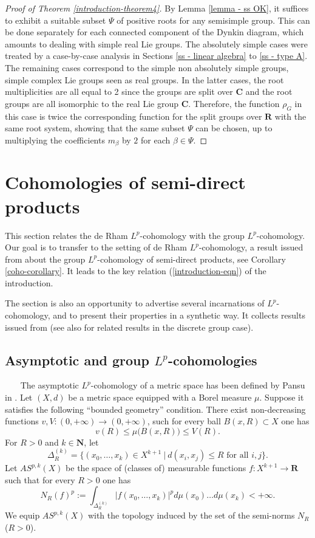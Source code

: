 \documentclass[JEP,XML,SOM,Unicode,published]{cedram}
\newcommand{\CC}{\mathbf{C}}
\newcommand{\NN}{\mathbf{N}}
\newcommand{\RR}{\mathbf{R}}
\theoremstyle{plain}
\theoremstyle{remark}
\theoremstyle{definition}
\begin{document}
\begin{proof}[Proof of Theorem \ref{introduction-theorem4}]
By Lemma \ref{lemma - ss OK}, it suffices to exhibit a suitable subset $\Psi$ of positive roots for any semisimple group.
This can be done separately for each connected component of the Dynkin diagram, which amounts to dealing with simple real Lie groups.
The absolutely simple cases were treated by a case-by-case analysis in Sections \ref{ss - linear algebra} to \ref{ss - type A}.
The remaining cases correspond to the simple non absolutely simple groups, \ie simple complex Lie groups seen as real groups.
In the latter cases, the root multiplicities are all equal to 2 since the groups are split over $\CC$ and the root groups are all isomorphic to the real Lie group $\CC$.
Therefore, the function $\rho_G$ in this case is twice the corresponding function for the split groups over $\RR$ with the same root system, showing that the same subset $\Psi$ can be chosen, up to multiplying the coefficients $m_\beta$ by $2$ for each $\beta \in \Psi$.
\end{proof}

\section {Cohomologies of semi-direct products}
\label{s - psd}

This section relates the de Rham $L^p$\nobreakdash-cohomology with the group $L^p$\nobreakdash-cohomology. Our goal
is to transfer to the setting of de Rham $L^p$\nobreakdash-cohomology, a result issued from \cite{BR} about the group $L^p$\nobreakdash-cohomology
of semi-direct products, see Corollary \ref{coho-corollary}.
It leads to the key relation (\ref{introduction-eqn}) of the introduction.

The section is also an opportunity to advertise several incarnations of $L^p$\nobreakdash-cohomo\-lo\-gy,
and to present their properties in a synthetic way. It collects results issued from \cite{Pa95, SaSc, BR}
(see also \cite{Elek} for related results in the discrete group case).

\subsection{Asymptotic and group $L^p$-cohomologies}\label{coho-group}
~~~ The asymptotic $L^p$\nobreakdash-cohomology of a metric space has been defined by Pansu in \cite{Pa95}.
Let $(X, d)$ be a metric space equipped with a Borel measure $\mu$. Suppose it satisfies the following ``bounded geometry''
condition. There exist non-decreasing functions $v, V: (0, +\infty) \to (0, +\infty)$, such for every ball
$B(x, R) \subset X$ one has
\[v(R) \leqslant \mu \bigl(B(x,R)\bigr) \leqslant V(R).\]
For $R >0$ and $k\in {\NN}$, let
\[\Delta_R^{(k)} = \{(x_0,\dots , x_k) \in X^{k+1} ~\vert~ d(x_i, x_j) \leqslant R \,\, \text{for all $i,j$}\}.\]
Let $AS^{p,k}(X)$ be the space of (classes of) measurable functions $f: X^{k+1} \to \RR$ such that for every
$R >0$ one has
\[N_R (f)^p:= \int_{\Delta_R^{(k)}} \bigl\vert f (x_0, \dots ,x_k) \bigr\vert^p d\mu(x_0) \dots d\mu (x_k) < +\infty.\]
We equip $AS^{p,k}(X)$ with the topology induced by the set of the semi-norms $N_R$ ($R>0$).
\end{document}
